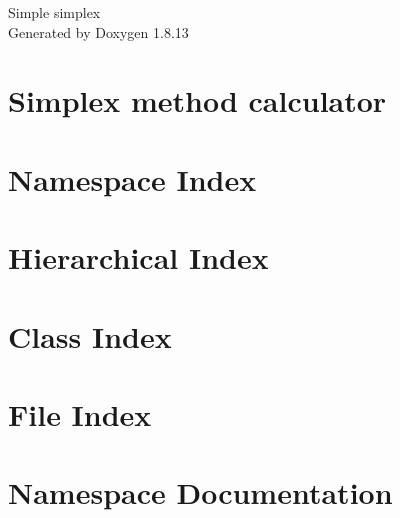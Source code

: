 \documentclass[twoside]{book}
\newcommand{\+}{\discretionary{\mbox{\scriptsize$\hookleftarrow$}}{}{}}
\newcommand{\clearemptydoublepage}{%
  \newpage{\pagestyle{empty}\cleardoublepage}%
}
\begin{document}
\hypersetup{pageanchor=false,
             bookmarksnumbered=true,
             pdfencoding=unicode
            }
\begin{titlepage}
\vspace*{7cm}
\begin{center}%
{\Large Simple simplex }\\
\vspace*{1cm}
{\large Generated by Doxygen 1.8.13}\\
\end{center}
\end{titlepage}
\clearemptydoublepage
{}
\tableofcontents
\clearemptydoublepage
{}
\hypersetup{pageanchor=true}

\chapter{Simplex method calculator}
\label{index}\hypertarget{index}{}
\chapter{Namespace Index}

\chapter{Hierarchical Index}

\chapter{Class Index}

\chapter{File Index}

\chapter{Namespace Documentation}

\end{document}

